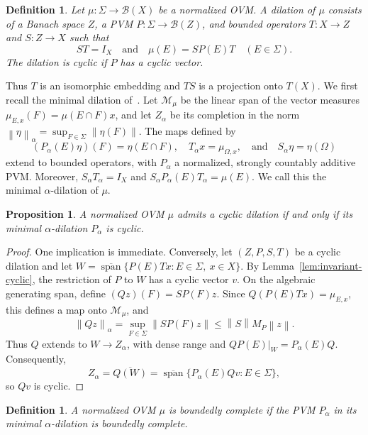 \documentclass[11pt,leqno]{amsart}
\theoremstyle{compact}
\numberwithin{equation}{section}
\newtheorem{proposition}[theorem]{Proposition}
\newtheorem{definition}[theorem]{Definition}
\theoremstyle{compactremark}
\theoremstyle{compact}
\def\cspan{\overline{\operatorname{span}}}
\newcommand{\1}{\mathbbm{1}}
\newcommand{\cB}{\mathcal{B}}
\newcommand{\norm}[1]{\left\|#1\right\|}
\begin{document}
\begin{definition}
Let $\mu\colon\Sigma\to\cB(X)$ be a normalized OVM. A \emph{dilation} of $\mu$ consists of a Banach space $Z$, a PVM $P\colon\Sigma\to\cB(Z)$, and bounded operators $T\colon X\to Z$ and $S\colon Z\to X$ such that
\[
ST=I_X \quad \text{and}\quad \mu(E)=SP(E)T\quad(E\in\Sigma).
\]
The dilation is \emph{cyclic} if $P$ has a cyclic vector.
\end{definition}

Thus $T$ is an isomorphic embedding and $TS$ is a projection onto $T(X)$. We first recall the minimal dilation of~\cite[Definition~2.28 and Theorem~2.30]{HanLarsonLiuLiu2014}. Let $\mathcal M_\mu$ be the linear span of the vector measures $\mu_{E,x}(F)=\mu(E\cap F)x$, and let $Z_\alpha$ be its completion in the norm $\norm{\eta}_\alpha=\sup_{F\in\Sigma}\norm{\eta(F)}$. The maps defined by
\[
(P_\alpha(E)\eta)(F)=\eta(E\cap F),\quad T_\alpha x=\mu_{\Omega,x},\quad\text{and}\quad S_\alpha\eta=\eta(\Omega)
\]
extend to bounded operators, with $P_\alpha$ a normalized, strongly countably additive PVM. Moreover, $S_\alpha T_\alpha=I_X$ and $S_\alpha P_\alpha(E)T_\alpha=\mu(E)$. We call this the minimal $\alpha$-dilation of $\mu$.

\begin{proposition}\label{prop:minimal-cyclic}
A normalized OVM $\mu$ admits a cyclic dilation if and only if its minimal $\alpha$-dilation $P_\alpha$ is cyclic.
\end{proposition}

\begin{proof}
One implication is immediate. Conversely, let $(Z,P,S,T)$ be a cyclic dilation and let $W=\cspan\{P(E)Tx:E\in\Sigma,\ x\in X\}$. By Lemma~\ref{lem:invariant-cyclic}, the restriction of $P$ to $W$ has a cyclic vector $v$. On the algebraic generating span, define $(Qz)(F)=SP(F)z$. Since $Q(P(E)Tx)=\mu_{E,x}$, this defines a map onto $\mathcal M_\mu$, and
\[
\norm{Qz}_\alpha=\sup_{F\in\Sigma}\norm{SP(F)z}\leq\norm{S}M_P\norm{z}.
\]
Thus $Q$ extends to $W\to Z_\alpha$, with dense range and $QP(E)|_W=P_\alpha(E)Q$. Consequently,
\[
Z_\alpha=\overline{Q(W)}=\cspan\{P_\alpha(E)Qv:E\in\Sigma\},
\]
so $Qv$ is cyclic.
\end{proof}

\begingroup
\begin{definition}\label{def:ovm-bounded-complete}
A normalized OVM $\mu$ is \emph{boundedly complete} if the PVM $P_\alpha$ in its minimal $\alpha$-dilation is boundedly complete.
\end{definition}
\end{document}
